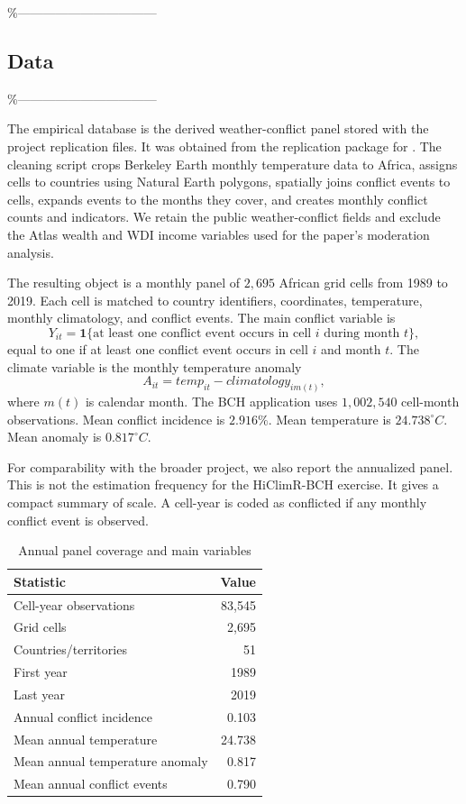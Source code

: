 \documentclass[
]{article}
\begin{document}
\%---------------------------------

\subsection{Data}

\%---------------------------------

The empirical database is the derived weather-conflict panel stored with
the project replication files. It was obtained from the replication
package for \citet{burke2024}. The cleaning script crops Berkeley Earth
monthly temperature data to Africa, assigns cells to countries using
Natural Earth polygons, spatially joins conflict events to cells,
expands events to the months they cover, and creates monthly conflict
counts and indicators. We retain the public weather-conflict fields and
exclude the Atlas wealth and WDI income variables used for the paper's
moderation analysis.

The resulting object is a monthly panel of \(2,695\) African grid cells
from 1989 to 2019. Each cell is matched to country identifiers,
coordinates, temperature, monthly climatology, and conflict events. The
main conflict variable is \[
Y_{it}=\mathbf 1\{\text{at least one conflict event occurs in cell } i \text{ during month } t\},
\] equal to one if at least one conflict event occurs in cell \(i\) and
month \(t\). The climate variable is the monthly temperature anomaly \[
A_{it}=temp_{it}-climatology_{im(t)},
\] where \(m(t)\) is calendar month. The BCH application uses
\(1{,}002{,}540\) cell-month observations. Mean conflict incidence is
\(2.916\%\). Mean temperature is \(24.738^\circ C\). Mean anomaly is
\(0.817^\circ C\).

For comparability with the broader project, we also report the
annualized panel. This is not the estimation frequency for the
HiClimR-BCH exercise. It gives a compact summary of scale. A cell-year
is coded as conflicted if any monthly conflict event is observed.

\begin{table}[H]
\centering
\caption{Annual panel coverage and main variables}
\label{tab:descriptive-panel-summary}
\begin{tabular}{lr}
\toprule
Statistic & Value\\
\midrule
Cell-year observations & 83,545\\
Grid cells & 2,695\\
Countries/territories & 51\\
First year & 1989\\
Last year & 2019\\
Annual conflict incidence & 0.103\\
Mean annual temperature & 24.738\\
Mean annual temperature anomaly & 0.817\\
Mean annual conflict events & 0.790\\
\bottomrule
\end{tabular}
\end{table}
\end{document}
